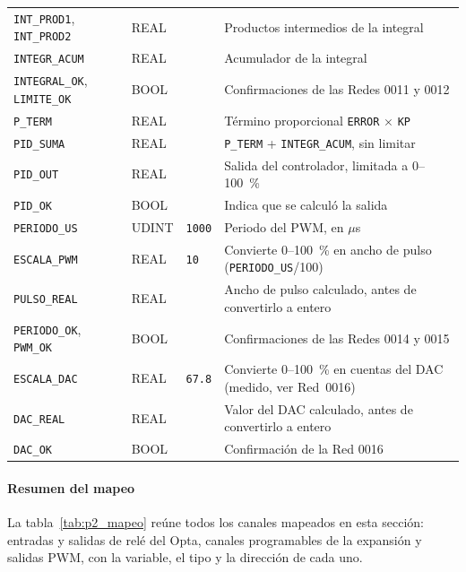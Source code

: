 \documentclass[12pt,a4paper]{article}
\begin{document}
\begin{table}[H]
\begin{tabularx}{\linewidth}{l l l X}
\texttt{INT\_PROD1}, \texttt{INT\_PROD2} & REAL &                & Productos intermedios de la integral \\
\texttt{INTEGR\_ACUM}               & REAL  &                  & Acumulador de la integral \\
\texttt{INTEGRAL\_OK}, \texttt{LIMITE\_OK} & BOOL &              & Confirmaciones de las Redes 0011 y 0012 \\
\texttt{P\_TERM}                    & REAL  &                  & Término proporcional \texttt{ERROR} $\times$ \texttt{KP} \\
\texttt{PID\_SUMA}                  & REAL  &                  & \texttt{P\_TERM} + \texttt{INTEGR\_ACUM}, sin limitar \\
\texttt{PID\_OUT}                   & REAL  &                  & Salida del controlador, limitada a 0--100~\% \\
\texttt{PID\_OK}                    & BOOL  &                  & Indica que se calculó la salida \\
\texttt{PERIODO\_US}                & UDINT & \texttt{1000}    & Periodo del PWM, en $\mu$s \\
\texttt{ESCALA\_PWM}                & REAL  & \texttt{10}      & Convierte 0--100~\% en ancho de pulso (\texttt{PERIODO\_US}/100) \\
\texttt{PULSO\_REAL}                & REAL  &                  & Ancho de pulso calculado, antes de convertirlo a entero \\
\texttt{PERIODO\_OK}, \texttt{PWM\_OK} & BOOL &                  & Confirmaciones de las Redes 0014 y 0015 \\
\texttt{ESCALA\_DAC}                & REAL  & \texttt{67.8}    & Convierte 0--100~\% en cuentas del DAC (medido, ver Red~0016) \\
\texttt{DAC\_REAL}                  & REAL  &                  & Valor del DAC calculado, antes de convertirlo a entero \\
\texttt{DAC\_OK}                    & BOOL  &                  & Confirmación de la Red 0016 \\
\bottomrule
\end{tabularx}
\end{table}

\paragraph{Resumen del mapeo}
La tabla~\ref{tab:p2_mapeo} reúne todos los canales mapeados en esta
sección: entradas y salidas de relé del Opta, canales programables de la
expansión y salidas PWM, con la variable, el tipo y la dirección de cada
uno.
\end{document}
